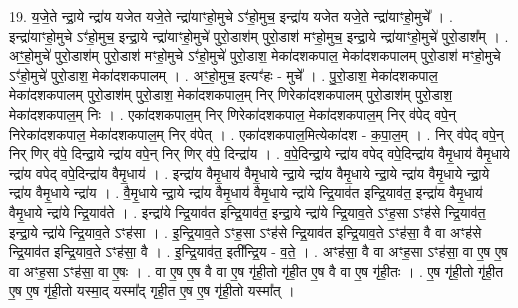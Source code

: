 \documentclass[17pt]{extarticle}
\begin{document}
19. य॒जे॒ते न्द्रा॒ये न्द्रा॑य यजेत यजे॒ते न्द्रा॑याꣳहो॒मुचे ऽꣳ॑हो॒मुच॒ इन्द्रा॑य यजेत यजे॒ते न्द्रा॑याꣳहो॒मुचे᳚ । . इन्द्रा॑याꣳहो॒मुचे ऽꣳ॑हो॒मुच॒ इन्द्रा॒ये न्द्रा॑याꣳहो॒मुचे॑ पुरो॒डाश॑म् पुरो॒डाश॑ मꣳहो॒मुच॒ इन्द्रा॒ये न्द्रा॑याꣳहो॒मुचे॑ पुरो॒डाश᳚म् । . अꣳ॒॒हो॒मुचे॑ पुरो॒डाश॑म् पुरो॒डाश॑ मꣳहो॒मुचे ऽꣳ॑हो॒मुचे॑ पुरो॒डाश॒ मेका॑दशकपाल॒ मेका॑दशकपालम् पुरो॒डाश॑ मꣳहो॒मुचे ऽꣳ॑हो॒मुचे॑ पुरो॒डाश॒ मेका॑दशकपालम् । . अꣳ॒॒हो॒मुच॒ इत्यꣳ॑हः - मुचे᳚ । . पु॒रो॒डाश॒ मेका॑दशकपाल॒ मेका॑दशकपालम् पुरो॒डाश॑म् पुरो॒डाश॒ मेका॑दशकपाल॒म् निर् णिरेका॑दशकपालम् पुरो॒डाश॑म् पुरो॒डाश॒ मेका॑दशकपाल॒म् निः । . एका॑दशकपाल॒म् निर् णिरेका॑दशकपाल॒ मेका॑दशकपाल॒म् निर् व॑पेद् वपे॒न् निरेका॑दशकपाल॒ मेका॑दशकपाल॒म् निर् व॑पेत् । . एका॑दशकपाल॒मित्येका॑दश - क॒पा॒ल॒म् । . निर् व॑पेद् वपे॒न् निर् णिर् व॑पे॒ दिन्द्रा॒ये न्द्रा॑य वपे॒न् निर् णिर् व॑पे॒ दिन्द्रा॑य । . व॒पे॒दिन्द्रा॒ये न्द्रा॑य वपेद् वपे॒दिन्द्रा॑य वैमृ॒धाय॑ वैमृ॒धाये न्द्रा॑य वपेद् वपे॒दिन्द्रा॑य वैमृ॒धाय॑ । . इन्द्रा॑य वैमृ॒धाय॑ वैमृ॒धाये न्द्रा॒ये न्द्रा॑य वैमृ॒धाये न्द्रा॒ये न्द्रा॑य वैमृ॒धाये न्द्रा॒ये न्द्रा॑य वैमृ॒धाये न्द्रा॑य । . वै॒मृ॒धाये न्द्रा॒ये न्द्रा॑य वैमृ॒धाय॑ वैमृ॒धाये न्द्रा॑ये न्द्रि॒याव॑त इन्द्रि॒याव॑त॒ इन्द्रा॑य वैमृ॒धाय॑ वैमृ॒धाये न्द्रा॑ये न्द्रि॒याव॑ते । . इन्द्रा॑ये न्द्रि॒याव॑त इन्द्रि॒याव॑त॒ इन्द्रा॒ये न्द्रा॑ये न्द्रि॒याव॒ते ऽꣳह॒सा ऽꣳह॑से न्द्रि॒याव॑त॒ इन्द्रा॒ये न्द्रा॑ये न्द्रि॒याव॒ते ऽꣳह॑सा । . इ॒न्द्रि॒याव॒ते ऽꣳह॒सा ऽꣳह॑से न्द्रि॒याव॑त इन्द्रि॒याव॒ते ऽꣳह॑सा॒ वै वा अꣳह॑से न्द्रि॒याव॑त इन्द्रि॒याव॒ते ऽꣳह॑सा॒ वै । . इ॒न्द्रि॒याव॑त॒ इती᳚न्द्रि॒य - व॒ते॒ । . अꣳह॑सा॒ वै वा अꣳह॒सा ऽꣳह॑सा॒ वा ए॒ष ए॒ष वा अꣳह॒सा ऽꣳह॑सा॒ वा ए॒षः । . वा ए॒ष ए॒ष वै वा ए॒ष गृ॑ही॒तो गृ॑ही॒त ए॒ष वै वा ए॒ष गृ॑ही॒तः । . ए॒ष गृ॑ही॒तो गृ॑ही॒त ए॒ष ए॒ष गृ॑ही॒तो यस्मा॒द् यस्मा᳚द् गृही॒त ए॒ष ए॒ष गृ॑ही॒तो यस्मा᳚त् । \newline
\end{document}
